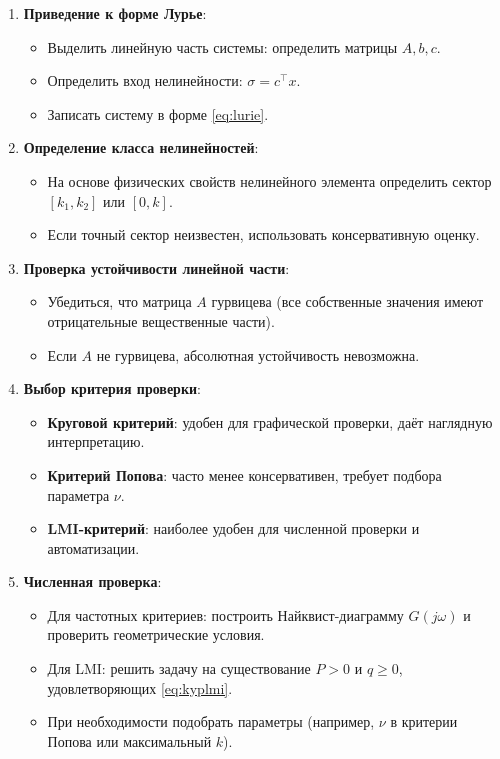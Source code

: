 \begin{enumerate}
    \item \textbf{Приведение к форме Лурье}:
    \begin{itemize}
        \item Выделить линейную часть системы: определить матрицы $A, b, c$.
        \item Определить вход нелинейности: $\sigma = c^\top x$.
        \item Записать систему в форме \eqref{eq:lurie}.
    \end{itemize}
    
    \item \textbf{Определение класса нелинейностей}:
    \begin{itemize}
        \item На основе физических свойств нелинейного элемента определить сектор $[k_1, k_2]$ или $[0, k]$.
        \item Если точный сектор неизвестен, использовать консервативную оценку.
    \end{itemize}
    
    \item \textbf{Проверка устойчивости линейной части}:
    \begin{itemize}
        \item Убедиться, что матрица $A$ гурвицева (все собственные значения имеют отрицательные вещественные части).
        \item Если $A$ не гурвицева, абсолютная устойчивость невозможна.
    \end{itemize}
    
    \item \textbf{Выбор критерия проверки}:
    \begin{itemize}
        \item \textbf{Круговой критерий}: удобен для графической проверки, даёт наглядную интерпретацию.
        \item \textbf{Критерий Попова}: часто менее консервативен, требует подбора параметра $\nu$.
        \item \textbf{LMI-критерий}: наиболее удобен для численной проверки и автоматизации.
    \end{itemize}
    
    \item \textbf{Численная проверка}:
    \begin{itemize}
        \item Для частотных критериев: построить Найквист-диаграмму $G(j\omega)$ и проверить геометрические условия.
        \item Для LMI: решить задачу на существование $P>0$ и $q\ge 0$, удовлетворяющих \eqref{eq:kyplmi}.
        \item При необходимости подобрать параметры (например, $\nu$ в критерии Попова или максимальный $k$).
    \end{itemize}
    

\end{enumerate}
